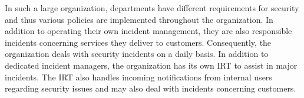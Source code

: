 In such a large organization, departments have different requirements for security and thus various policies are implemented throughout the organization. In addition to operating their own incident management, they are also responsible incidents concerning services they deliver to customers. Consequently, the organization deals with security incidents on a daily basis. In addition to dedicated incident managers, the organization has its own \ac{IRT} to assist in major incidents. The \ac{IRT} also handles incoming notifications from internal users regarding security issues and may also deal with incidents concerning customers. 